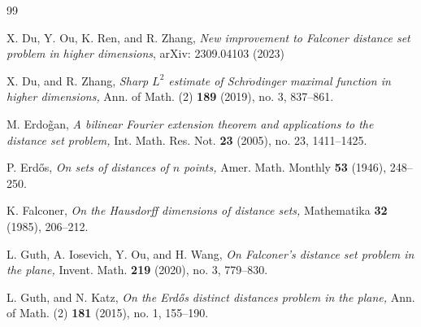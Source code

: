 \documentclass[a4paper,11pt]{amsart}
\numberwithin{equation}{section}
\begin{document}
\begin{thebibliography}{99}


 X. Du, Y. Ou, K. Ren, and R. Zhang,
\textit{New improvement to Falconer distance set problem in higher dimensions},
arXiv: 2309.04103 (2023)


X. Du, and R. Zhang,
\textit{Sharp $L^2$ estimate of Schr$\ddot{o}$dinger maximal function in higher dimensions,}
Ann. of Math. (2) \textbf{189} (2019), no. 3, 837--861.


M. Erdo\~{g}an,
\textit{A bilinear Fourier extension theorem and applications to the distance set problem,} Int. Math. Res. Not. \textbf{23} (2005), no. 23, 1411--1425.

P. Erd\H{o}s,
\textit{On sets of distances of $n$ points,} Amer. Math. Monthly \textbf{53} (1946), 248--250.

K. Falconer,
\textit{On the Hausdorff dimensions of distance sets,}
Mathematika \textbf{32} (1985), 206--212.









L. Guth, A. Iosevich, Y. Ou, and H. Wang, \textit{On Falconer's distance set problem in the plane,} Invent. Math. \textbf{219} (2020), no. 3, 779--830.



L. Guth, and N. Katz, \textit{On the Erd\H{o}s distinct distances problem in the plane,}
Ann. of Math. (2) \textbf{181} (2015), no. 1, 155--190.


\end{thebibliography}
\end{document}
